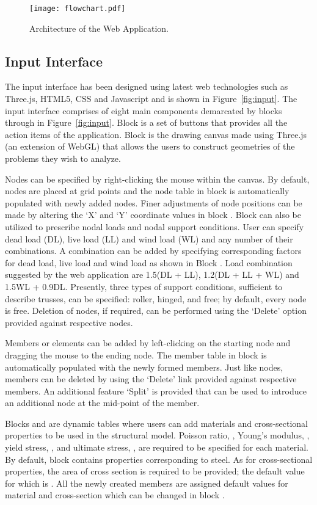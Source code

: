 \documentclass[preprint]{elsarticle}
\begin{document}
\begin{figure}[!h]
\centering
\texttt{[image: flowchart.pdf]}
\caption{Architecture of the Web Application.}
\label{fig:system}
\end{figure}


\subsection{Input Interface}
The input interface has been designed using latest web technologies such as
Three.js, HTML5, CSS and Javascript and is shown in Figure~\ref{fig:input}. The
input interface comprises of eight main components demarcated by blocks 
through  in Figure~\ref{fig:input}. Block  is a set of buttons that provides
all the action items of the application. Block  is the drawing canvas made using
Three.js (an extension of WebGL) that allows the users to construct geometries
of the problems they wish to analyze.

Nodes can be specified by right-clicking the mouse within the canvas. By default, nodes are placed at grid points and the node table in block  is automatically populated with newly added nodes. Finer adjustments of node positions can be made by altering the `X' and `Y' coordinate values in block . Block  can also be utilized to prescribe nodal loads and nodal support conditions. User can specify dead load (DL), live load (LL) and wind load (WL) and any number of their combinations. A combination can be added by specifying corresponding factors for dead load, live load and wind load as shown in Block . Load combination suggested by the web application are 1.5(DL + LL), 1.2(DL + LL + WL) and 1.5WL + 0.9DL.  Presently, three types of support conditions, sufficient to describe trusses, can be specified: roller, hinged, and free; by default, every node is free. Deletion of nodes, if required, can be performed using the `Delete' option provided against respective nodes.

Members or elements can be added by left-clicking on the starting node and
dragging the mouse to the ending node. The member table in block  is automatically
populated with the newly formed members. Just like nodes, members can be deleted
by using the `Delete' link provided against respective members. An additional
feature `Split' is provided that can be used to introduce an additional node at
the mid-point of the member.

Blocks  and  are dynamic tables where users can add materials and 
cross-sectional properties to be used in the structural model. Poisson ratio, , Young's
modulus, , yield stress, , and ultimate stress, ,
are required to be specified for each material. By default, block  contains
properties corresponding to steel. As for cross-sectional properties, the
area of cross section is required to be provided; the default value for which is
. All the newly created members are assigned default values
for material and cross-section which can be changed in block .
\end{document}

